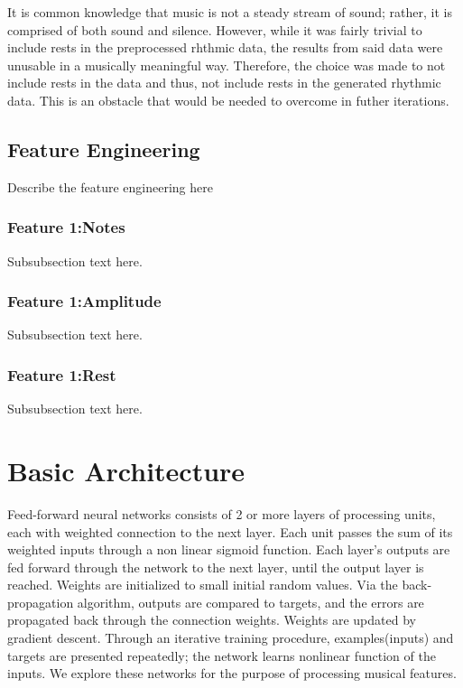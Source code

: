 \documentclass[conference]{IEEEtran}
\begin{document}
It is common knowledge that music is not a steady stream of sound; rather, it is comprised of both sound and silence. However, while it was fairly trivial to include rests in the preprocessed rhthmic data, the results from said data were unusable in a musically meaningful way. Therefore, the choice was made to not include rests in the data and thus, not include rests in the generated rhythmic data. This is an obstacle that would be needed to overcome in futher iterations.

\subsection{Feature Engineering} \label{Feature Engineering}
Describe the feature engineering here

\subsubsection{Feature 1:Notes} \label{f1notes}
Subsubsection text here.

\subsubsection{Feature 1:Amplitude} \label{f2amp}
Subsubsection text here.

\subsubsection{Feature 1:Rest} \label{f3rest}
Subsubsection text here.

\section{Basic Architecture}
Feed-forward neural networks consists of 2 or more layers of processing units, each with weighted connection to the next layer. Each unit passes the sum of its weighted inputs through a non linear sigmoid function. Each layer's outputs are fed forward through the network to the next layer, until the output layer is reached. Weights are initialized to small initial random values. Via the back-propagation algorithm, outputs are compared to targets, and the errors are propagated back through the connection weights. Weights are updated by gradient descent. Through an iterative training procedure, examples(inputs) and targets are presented repeatedly; the network learns nonlinear function of the inputs. We explore these networks for the purpose of processing musical features.\cite{judy1}
\end{document}
